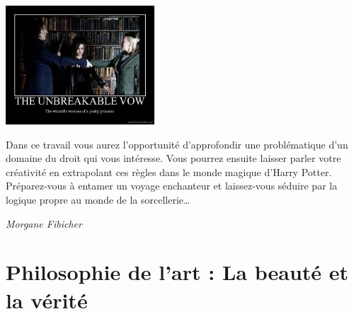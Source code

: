 \documentclass[
  10pt,
  french,
  a5paper,
  openany]{book}
\newenvironment{signature}{\begin{flushright}}{\end{flushright}}
\begin{document}
\begin{center}
\includegraphics[width=\textwidth,height=12em]{images/le-droit-dans-lunivers-dharry-potter-2.jpg}

\end{center}

Dans ce travail vous aurez l'opportunité d'approfondir une problématique d'un domaine du droit qui vous intéresse. Vous pourrez ensuite laisser parler votre créativité en extrapolant ces règles dans le monde magique d'Harry Potter. Préparez-vous à entamer un voyage enchanteur et laissez-vous séduire par la logique propre au monde de la sorcellerie\ldots{}

\begin{signature}
\emph{Morgane Fibicher}

\end{signature}

\hypertarget{philosophie-de-lart-la-beautuxe9-et-la-vuxe9rituxe9}{%
\chapter{Philosophie de l'art : La beauté et la vérité}\label{philosophie-de-lart-la-beautuxe9-et-la-vuxe9rituxe9}}
\end{document}
